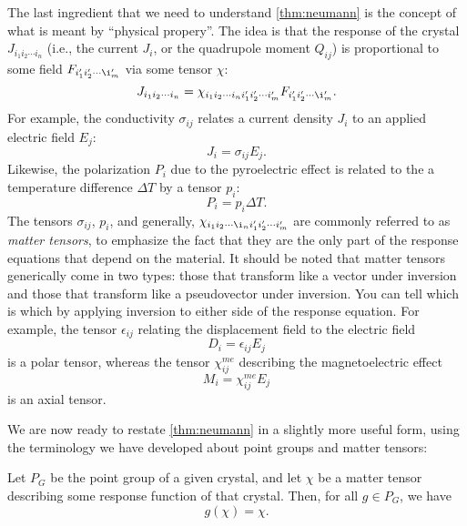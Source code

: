 The last ingredient that we need to understand \cref{thm:neumann} is the concept of what is meant by ``physical propery''.
The idea is that the response of the crystal $J_{i_1i_2\cdots i_n}$ (i.e., the current $J_i$, or the quadrupole moment $Q_{ij}$) is proportional to some field $F_{i_1'i_2'\cdots \i_m'}$ via some tensor $\chi$:
\begin{equation}
J_{i_1i_2\cdots i_n} = \chi_{i_1i_2\cdots i_n i_1' i_2'\cdots i_m'}F_{i_1' i_2' \cdots \i_m'}.
\end{equation}
For example, the conductivity $\sigma_{ij}$ relates a current density $J_i$ to an applied electric field $E_j$:
\begin{equation}
J_i = \sigma_{ij} E_j.
\end{equation}
Likewise, the polarization $P_i$ due to the pyroelectric effect is related to the a temperature difference $\Delta T$ by a tensor $p_i$:
\begin{equation}
P_i = p_i \Delta T.
\end{equation}
The tensors $\sigma_{ij}$, $p_i$, and generally, $\chi_{i_1 i_2 \cdots \i_n i_1' i_2' \cdots i_m'}$ are commonly referred to as \emph{matter tensors}\cite{powell}, to emphasize the fact that they are the only part of the response equations that depend on the material.
It should be noted that matter tensors generically come in two types: those that transform like a vector under inversion and those that transform like a pseudovector under inversion.
You can tell which is which by applying inversion to either side of the response equation.
For example, the tensor $\epsilon_{ij}$ relating the displacement field to the electric field
\begin{equation}
D_i = \epsilon_{ij}E_j
\end{equation} 
is a polar tensor, whereas the tensor $\chi^{me}_{ij}$ describing the magnetoelectric effect
\begin{equation}
M_i = \chi^{me}_{ij} E_j
\end{equation}
is an axial tensor.

We are now ready to restate \cref{thm:neumann} in a slightly more useful form, using the terminology we have developed about point groups and matter tensors:
\begin{theorem}\label{thm:neumannrestated}
Let $P_G$ be the point group of a given crystal, and let $\chi$ be a matter tensor describing some response function of that crystal.
Then, for all $g \in P_G$, we have
\begin{equation}\label{eq:nmmath}
g(\chi) = \chi.
\end{equation}
\end{theorem}

